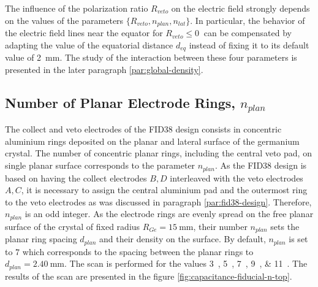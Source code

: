 The influence of the polarization ratio $R_{veto}$ on the electric field strongly depends on the values of the parameters $\{R_{veto}, n_{plan}, n_{lat} \}$. In particular, the behavior of the electric field lines near the equator for $R_{veto} \leq \SI{0}{}$ can be compensated by adapting the value of the equatorial distance $d_{eq}$ instead of fixing it to its default value of \SI{2}{\mm}. The study of the interaction between these four parameters is presented in the later paragraph \ref{par:global-density}.

\subsection{Number of Planar Electrode Rings, $n_{plan}$}
\label{par:n-plan}

The collect and veto electrodes of the FID38 design consists in concentric aluminium rings deposited on the planar and lateral surface of the germanium crystal. The number of concentric planar rings, including the central veto pad, on single planar surface corresponds to the parameter $n_{plan}$.
As the FID38 design is based on having the collect electrodes $B,D$ interleaved with the veto electrodes $A,C$, it is necessary to assign the central aluminium pad and the outermost ring to the veto electrodes as was discussed in paragraph \ref{par:fid38-design}. Therefore, $n_{plan}$ is an odd integer. As the electrode rings are evenly spread on the free planar surface of the crystal of fixed radius $R_{Ge}=\SI{15}{\mm}$, their number $n_{plan}$ sets the planar ring spacing $d_{plan}$ and their density on the surface.
By default, $n_{plan}$ is set to $7$ which corresponds to the spacing between the planar rings to $d_{plan}=\SI{2.40}{\mm}$.  The scan is performed for the values \SIlist{3;5;7;9;11}{}. The results of the scan are presented in the figure \ref{fig:capacitance-fiducial-n-top}.

